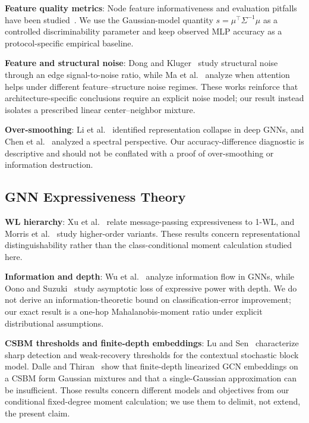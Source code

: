 \textbf{Feature quality metrics}: Node feature informativeness and evaluation pitfalls have been studied~\cite{shchur2018pitfalls}. We use the Gaussian-model quantity $s=\mu^\top\Sigma^{-1}\mu$ as a controlled discriminability parameter and keep observed MLP accuracy as a protocol-specific empirical baseline.

\textbf{Feature and structural noise}: Dong and Kluger~\cite{pmlr-v202-dong23a} study structural noise through an edge signal-to-noise ratio, while Ma et al.~\cite{pmlr-v267-ma25w} analyze when attention helps under different feature--structure noise regimes. These works reinforce that architecture-specific conclusions require an explicit noise model; our result instead isolates a prescribed linear center--neighbor mixture.

\textbf{Over-smoothing}: Li et al.~\cite{li2018oversmoothing} identified representation collapse in deep GNNs, and Chen et al.~\cite{chen2020oversmoothing} analyzed a spectral perspective. Our accuracy-difference diagnostic is descriptive and should not be conflated with a proof of over-smoothing or information destruction.

\subsection{GNN Expressiveness Theory}

\textbf{WL hierarchy}: Xu et al.~\cite{xu2019gin} relate message-passing expressiveness to 1-WL, and Morris et al.~\cite{morris2019wl} study higher-order variants. These results concern representational distinguishability rather than the class-conditional moment calculation studied here.

\textbf{Information and depth}: Wu et al.~\cite{wu2023infognn} analyze information flow in GNNs, while Oono and Suzuki~\cite{oono2020exponential} study asymptotic loss of expressive power with depth. We do not derive an information-theoretic bound on classification-error improvement; our exact result is a one-hop Mahalanobis-moment ratio under explicit distributional assumptions.

\textbf{CSBM thresholds and finite-depth embeddings}: Lu and Sen~\cite{lu2023contextual} characterize sharp detection and weak-recovery thresholds for the contextual stochastic block model. Dalle and Thiran~\cite{pmlr-v269-dalle25a} show that finite-depth linearized GCN embeddings on a CSBM form Gaussian mixtures and that a single-Gaussian approximation can be insufficient. Those results concern different models and objectives from our conditional fixed-degree moment calculation; we use them to delimit, not extend, the present claim.

